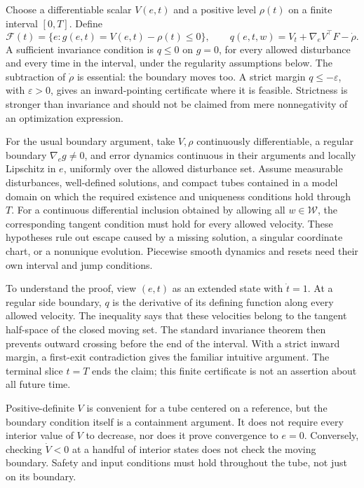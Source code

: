 \documentclass[12pt, openany]{book}
\theoremstyle{plain}
\begin{document}
Choose a differentiable scalar $V(e,t)$ and a positive level $\rho(t)$ on a finite interval $[0,T]$. Define
\begin{equation}
 \mathcal F(t)=\{e:g(e,t)=V(e,t)-\rho(t)\leq0\},\qquad
 q(e,t,w)=V_t+\nabla_e V^\top F-\dot\rho.
 \label{eq:funnel_boundary_derivative}
\end{equation}
A sufficient invariance condition is $q\leq0$ on $g=0$, for every allowed disturbance and every time in the interval, under the regularity assumptions below. The subtraction of $\dot\rho$ is essential: the boundary moves too. A strict margin $q\leq-\varepsilon$, with $\varepsilon>0$, gives an inward-pointing certificate where it is feasible. Strictness is stronger than invariance and should not be claimed from mere nonnegativity of an optimization expression.

For the usual boundary argument, take $V,\rho$ continuously differentiable, a regular boundary $\nabla_e g\neq0$, and error dynamics continuous in their arguments and locally Lipschitz in $e$, uniformly over the allowed disturbance set. Assume measurable disturbances, well-defined solutions, and compact tubes contained in a model domain on which the required existence and uniqueness conditions hold through $T$. For a continuous differential inclusion obtained by allowing all $w\in\mathcal W$, the corresponding tangent condition must hold for every allowed velocity. These hypotheses rule out escape caused by a missing solution, a singular coordinate chart, or a nonunique evolution. Piecewise smooth dynamics and resets need their own interval and jump conditions.

To understand the proof, view $(e,t)$ as an extended state with $\dot t=1$. At a regular side boundary, $q$ is the derivative of its defining function along every allowed velocity. The inequality says that these velocities belong to the tangent half-space of the closed moving set. The standard invariance theorem then prevents outward crossing before the end of the interval. With a strict inward margin, a first-exit contradiction gives the familiar intuitive argument. The terminal slice $t=T$ ends the claim; this finite certificate is not an assertion about all future time.

Positive-definite $V$ is convenient for a tube centered on a reference, but the boundary condition itself is a containment argument. It does not require every interior value of $V$ to decrease, nor does it prove convergence to $e=0$. Conversely, checking $\dot V<0$ at a handful of interior states does not check the moving boundary. Safety and input conditions must hold throughout the tube, not just on its boundary.
\end{document}
